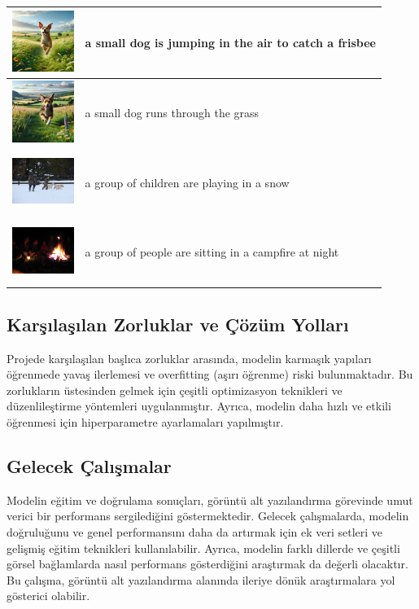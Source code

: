 \documentclass{article}
\begin{document}
\begin{table}[!h]
\begin{tabular}{|c|p{10cm}|}
\hline
\includegraphics[width=2cm,height=2cm]{kirda_kosan_kopek_2.jpg} & a small dog is jumping in the air to catch a frisbee \\
\hline
\includegraphics[width=2cm,height=2cm]{kirda_kosan_kopek_1.jpg} & a small dog runs through the grass \\
\hline
\includegraphics[width=2cm,height=2cm]{karda_yuruyen_kopekler_ve_cocuklar.jpg} & a group of children are playing in a snow \\
\hline
\includegraphics[width=2cm,height=2cm]{ates_etrafinda_insanlar.jpg} & a group of people are sitting in a campfire at night \\
\hline
\end{tabular}
\label{tablo:ornek-veri-tablosu}
\end{table}




\subsection{Karşılaşılan Zorluklar ve Çözüm Yolları}
Projede karşılaşılan başlıca zorluklar arasında, modelin karmaşık yapıları öğrenmede yavaş ilerlemesi ve overfitting (aşırı öğrenme) riski bulunmaktadır. Bu zorlukların üstesinden gelmek için çeşitli optimizasyon teknikleri ve düzenlileştirme yöntemleri uygulanmıştır. Ayrıca, modelin daha hızlı ve etkili öğrenmesi için hiperparametre ayarlamaları yapılmıştır.

\subsection{Gelecek Çalışmalar}
Modelin eğitim ve doğrulama sonuçları, görüntü alt yazılandırma görevinde umut verici bir performans sergilediğini göstermektedir. Gelecek çalışmalarda, modelin doğruluğunu ve genel performansını daha da artırmak için ek veri setleri ve gelişmiş eğitim teknikleri kullanılabilir. Ayrıca, modelin farklı dillerde ve çeşitli görsel bağlamlarda nasıl performans gösterdiğini araştırmak da değerli olacaktır. Bu çalışma, görüntü alt yazılandırma alanında ileriye dönük araştırmalara yol gösterici olabilir.
\end{document}
